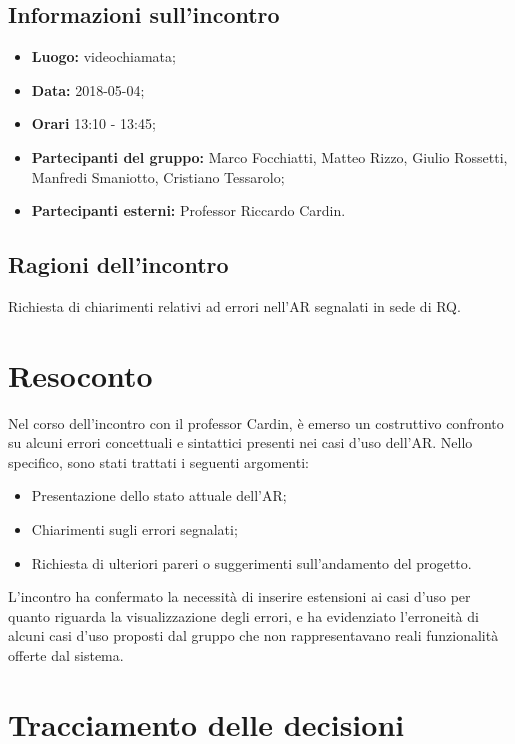 \documentclass[openany,12pt,a4paper]{article}
\begin{document}
  \subsection{Informazioni sull'incontro} 
   
  \begin{itemize}  
      \item \textbf{Luogo:} videochiamata;
      \item \textbf{Data:} 2018-05-04; 
      \item \textbf{Orari} 13:10 - 13:45;
      \item \textbf{Partecipanti del gruppo:} Marco Focchiatti, Matteo Rizzo, Giulio Rossetti, Manfredi Smaniotto, Cristiano Tessarolo; 
      \item \textbf{Partecipanti esterni:} Professor Riccardo Cardin. 
  \end{itemize} 
 
  \subsection{Ragioni dell'incontro} 
  Richiesta di chiarimenti relativi ad errori nell'AR segnalati in sede di RQ. 
 
  \section{Resoconto} 
  Nel corso dell'incontro con il professor Cardin, è emerso un costruttivo confronto su alcuni errori concettuali e sintattici presenti nei casi d'uso dell'AR. Nello specifico, sono stati trattati i seguenti argomenti: 
  
  \begin{itemize}
  	\item Presentazione dello stato attuale dell'AR;
    \item Chiarimenti sugli errori segnalati;
    \item Richiesta di ulteriori pareri o suggerimenti sull'andamento del progetto.
    
  \end{itemize}
  
  L'incontro ha confermato la necessità di inserire estensioni ai casi d'uso per quanto riguarda la visualizzazione degli errori, e ha evidenziato l'erroneità di alcuni casi d'uso proposti dal gruppo che non rappresentavano reali funzionalità offerte dal sistema.
  
  \section{Tracciamento delle decisioni} 
   
\end{document}
